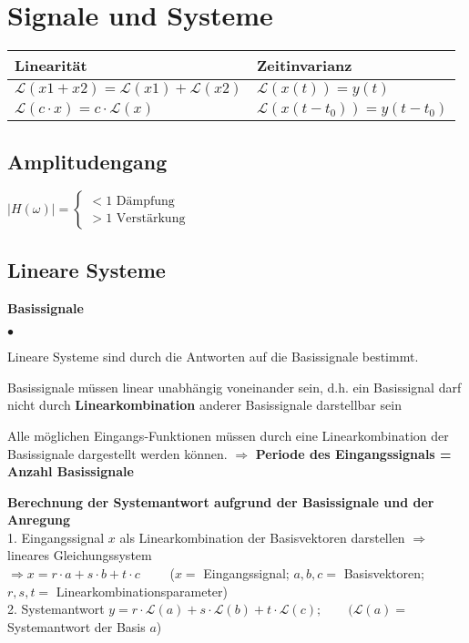 \section{Signale und Systeme}

	\begin{tabular}{|l|l|}
    	\hline
    	\textbf{Linearität} & \textbf{Zeitinvarianz}\\
    	\hline
    	$\mathcal{L}(x1+x2)=\mathcal{L}(x1)+\mathcal{L}(x2)$ & $\mathcal{L}(x(t)) = y(t)$ \\
    	$\mathcal{L}(c\cdot x)=c\cdot \mathcal{L}(x)$ & $\mathcal{L}(x(t-t_0)) = y(t-t_0)$ \\
		\hline    
    \end{tabular}
  	
	\subsection{Amplitudengang}
		$|H(\omega)| = \begin{cases}
			< 1 \text{ Dämpfung} \\
			> 1 \text{ Verstärkung}
		\end{cases}$
		
		
	\subsection{Lineare Systeme}
		\textbf{Basissignale}
		\begin{list}{$\bullet$}{\setlength{\itemsep}{0cm} \setlength{\parsep}{0cm} \setlength{\topsep}{0cm}} 
          \item Lineare Systeme sind durch die Antworten auf die
          Basissignale bestimmt.
          \item Basissignale müssen linear unabhängig voneinander sein, d.h. ein
		Basissignal darf nicht durch \textbf{Linearkombination} anderer Basissignale
		darstellbar sein          
		  \item Alle möglichen Eingangs-Funktionen müssen durch eine Linearkombination der
		Basissignale dargestellt werden können. $\Rightarrow$ \textbf{Periode des Eingangssignals =	Anzahl Basissignale}
        \end{list}
        \vspace{.2cm}
		\textbf{Berechnung der Systemantwort aufgrund der Basissignale und der
		Anregung}\\
		1. Eingangssignal $x$ als Linearkombination der Basisvektoren darstellen
		$\Rightarrow$ lineares Gleichungssystem\\
		$\Rightarrow x=r\cdot a + s\cdot b + t\cdot c\qquad$ ($x=$
		Eingangssignal; $a,b,c=$ Basisvektoren; $r,s,t=$
		Linearkombinationsparameter)\\ 
		2. Systemantwort $y=r\cdot \mathcal{L}(a) + s\cdot \mathcal{L}(b) + t\cdot \mathcal{L}(c); \qquad (\mathcal{L}(a)=$
		Systemantwort der Basis $a$)
	
